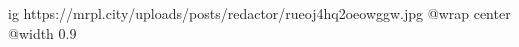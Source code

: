  
 
 
 
 

\ifcmt
  ig https://mrpl.city/uploads/posts/redactor/rueoj4hq2oeowggw.jpg
  @wrap center
  @width 0.9
\fi
